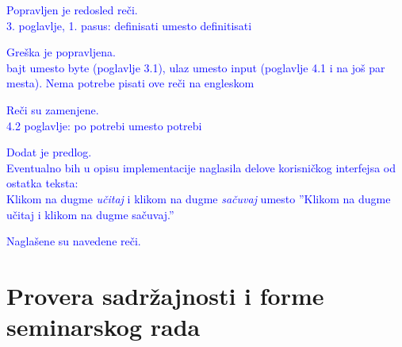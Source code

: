 \documentclass[a4paper]{report}
\newcommand{\odgovor}[1]{\textcolor{blue}{#1}}
\begin{document}
\odgovor {
Popravljen je redosled reči.
} \\

\odgovor {3. poglavlje, 1. pasus:
definisati umesto definitisati } 

\odgovor {
Greška je popravljena.
} \\

\odgovor {bajt umesto byte (poglavlje 3.1), ulaz umesto input (poglavlje 4.1 i na još par mesta). Nema potrebe pisati ove reči na engleskom } 

\odgovor {
Reči su zamenjene.
} \\

\odgovor { 4.2 poglavlje: po potrebi umesto potrebi } 

\odgovor {
Dodat je predlog.
} \\

\odgovor {Eventualno bih u opisu implementacije naglasila delove korisničkog interfejsa od ostatka teksta: \\
Klikom na dugme \textit{učitaj} i klikom na dugme \textit{sačuvaj} umesto ''Klikom na dugme učitaj i klikom na dugme sačuvaj.'' } 

\odgovor {
Naglašene su navedene reči.
}


\section{Provera sadržajnosti i forme seminarskog rada}
\end{document}

